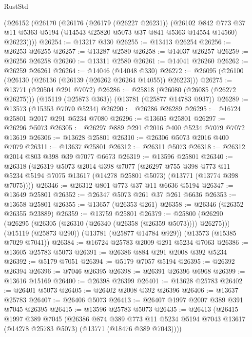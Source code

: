 \begin{lexlean}{RustStd}
\begin{coremodule}
    (@26152
      (@26170
        (@26176
          (@26179 (@26227 @26231))
          (@26102
            @842
            @773
            @37
            @11
            @5363
            @5194
            (@14543 @25820 @5073 @37 @841 @5363 @14554 @14560)
            @26223))))
@26254 := @13217 @330
@26255 := @13413 @26254
@26256 := @26253 @26255
@26257 := @13287 @2580
@26258 := @14037 @26257
@26259 := @26256 @26258
@26260 := @13311 @2580
@26261 := @14041 @26260
@26262 := @26259 @26261
@26264 := @14046 (@14048 @330)
@26272 := @26095 (@26100 (@26130 (@26136 (@26139 (@26262 @26264 @14055)) @26223)))
@26275 := @13771 (@20504 @291 @7072)
@26286 := @25818
    (@26080 (@26085 (@26272 @26275)))
    (@15119 (@25873 @363))
    (@13781 (@25877 @14783 @937))
@26289 := @13573 (@15353 @7070 @5234)
@26290 := @26286 @26289
@26295 := @16724 @25801 @2017 @291 @5234 @7080
@26296 := @13605 @25801
@26297 := @26296 @5073
@26305 := @26297 @889 @291 @2016 @400 @5234 @7079 @7072 @13619
@26306 := @13628 @25801
@26310 := @26306 @5073 @2016 @400 @7079
@26311 := @13637 @25801
@26312 := @26311 @5073
@26318 := @26312 @2014 @803 @398 @39 @7077 @6673
@26319 := @13596 @25801
@26340 := @26318
    (@26319
      @5073
      @2014
      @398
      @7077
      (@26297
        @755
        @398
        @773
        @11
        @5234
        @5194
        @7075
        @13617
        (@14278 @25801 @5073)
        (@13771 (@13774 @398 @7075))))
@26346 := @26312 @801 @773 @37 @11 @6636 @5194
@26347 := @13649 @25801
@26352 := @26347 @5073 @261 @37 @261 @6636
@26353 := @13658 @25801
@26355 := @13657 (@26353 @261)
@26358 := @26346 (@26352 @26355 @23889)
@26359 := @13759 @25801
@26379 := @25800
    (@26290 (@26295 (@26305 (@26310 (@26340 (@26358 (@26359 @5073)))) @26275)))
    (@15119 (@25873 @290))
    (@13781 (@25877 @14784 @929))
    (@13573 (@15385 @7029 @7041))
@26384 := @16724 @25783 @2009 @291 @5234 @7063
@26386 := @13605 @25783 @5073
@26391 := @26386 @884 @291 @2008 @392 @5234
@26392 := @5179 @7051
@26394 := @5179 @7057 @5194
@26395 := @26392 @26394
@26396 := @7046 @26395
@26398 := @26391 @26396 @6968
@26399 := @13616 @15169
@26400 := @26398 @26399
@26401 := @13628 @25783
@26402 := @26401 @5073
@26405 := @26402 @2008 @392 @26396
@26406 := @13637 @25783
@26407 := @26406 @5073
@26413 := @26407 @1997 @2007 @389 @391 @7045 @26395
@26415 := @13596 @25783 @5073
@26435 := @26413
    (@26415
      @1997
      @389
      @7045
      (@26386
        @874
        @389
        @773
        @11
        @5234
        @5194
        @7043
        @13617
        (@14278 @25783 @5073)
        (@13771 (@18476 @389 @7043))))

\end{coremodule}
\end{lexlean}
